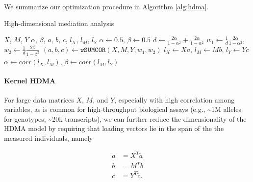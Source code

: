 \documentclass[
]{article}
\begin{document}
We summarize our optimization procedure in Algorithm \ref{alg:hdma}.

\begin{algorithm}
\caption{High-dimensional mediation analysis}\label{alg:hdma}
\begin{algorithmic}
\Require $X$, $M$, $Y$ 
\Ensure $\alpha$, $\beta$, $a$, $b$, $c$, $l_X$, $l_M$, $l_Y$ 
\State $\alpha \gets 0.5$, $\beta \gets 0.5$ 
\State $d \gets \frac{2\alpha}{1-\alpha^2} + \frac{2\alpha}{1-\alpha^2}$ 
\State $w_1 \gets \frac{1}{d}\frac{2\alpha}{1-\alpha^2}$, $w_2 \gets \frac{1}{d}\frac{2\beta}{1-\beta^2}$ 
\State $(a,b,c) \gets \texttt{wSUMCOR}(X, M, Y, w_1, w_2)$  
\State $l_X \gets Xa$, $l_M \gets Mb$, $l_Y \gets Yc$ 
\State $\alpha \gets {\mathrm corr}(l_X, l_M)$, $\beta \gets {\mathrm corr}(l_M, l_Y)$ 
\EndWhile
\end{algorithmic}
\end{algorithm}

\paragraph{Kernel HDMA}\label{kernel-hdma}

For large data matrices \(X\), \(M\), and \(Y\), especially with high
correlation among variables, as is common for high-throughput biological
assays (e.g., \textasciitilde1M alleles for genotypes,
\textasciitilde20k transcripts), we can further reduce the
dimensionality of the HDMA model by requiring that loading vectors lie
in the span of the the measured individuals, namely

\begin{align}
a &= X^T \tilde{a} \\
b &= M^T \tilde{b} \\
c &= Y^T \tilde{c}.
\end{align}
\end{document}
